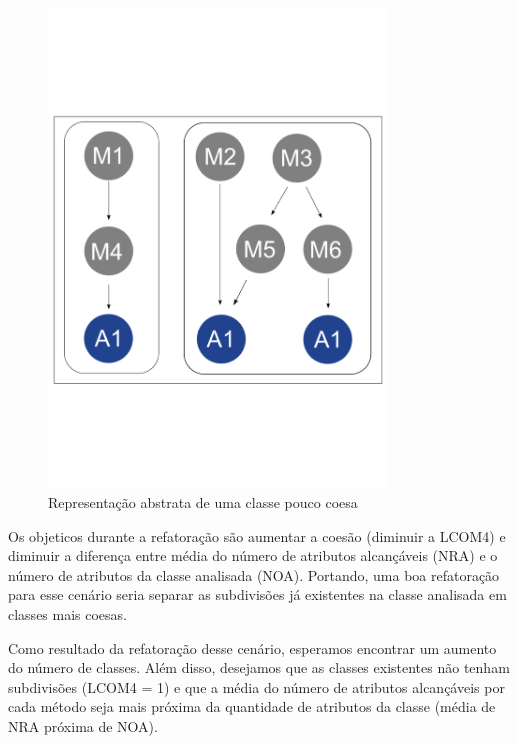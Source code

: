 	\begin{figure}[htb]
		\centering
		\includegraphics[trim = 0mm 50mm 0mm 60mm, clip, width=0.8\textwidth]{codigos/exemplos_para_os_cenarios/classe_pouco_coesa.png}
		\caption{Representação abstrata de uma classe pouco coesa}
		\label{classe_pouco_coesa}
	\end{figure}
	
	Os objeticos durante a refatoração são aumentar a coesão (diminuir a LCOM4) e diminuir a diferença entre média do número de atributos alcançáveis (NRA) e o número de atributos da classe analisada (NOA). Portando, uma boa refatoração para esse cenário seria separar as subdivisões já existentes na classe analisada em classes mais coesas.
	
	Como resultado da refatoração desse cenário, esperamos encontrar um aumento do número de classes. Além disso, desejamos que as classes existentes não tenham subdivisões (LCOM4 = 1) e que a média do número de atributos alcançáveis por cada método seja mais próxima da quantidade de atributos da classe (média de NRA próxima de NOA).
                  





